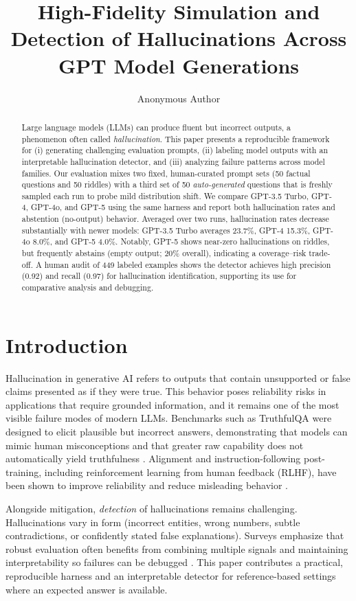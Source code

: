 \documentclass[11pt]{article}
\title{High-Fidelity Simulation and Detection of Hallucinations Across GPT Model Generations}
\author{Anonymous Author}
\date{}
\begin{document}
\maketitle

\begin{abstract}
Large language models (LLMs) can produce fluent but incorrect outputs, a phenomenon often called \emph{hallucination}. This paper presents a reproducible framework for (i) generating challenging evaluation prompts, (ii) labeling model outputs with an interpretable hallucination detector, and (iii) analyzing failure patterns across model families. Our evaluation mixes two fixed, human-curated prompt sets (50 factual questions and 50 riddles) with a third set of 50 \emph{auto-generated} questions that is freshly sampled each run to probe mild distribution shift. We compare GPT-3.5 Turbo, GPT-4, GPT-4o, and GPT-5 using the same harness and report both hallucination rates and abstention (no-output) behavior. Averaged over two runs, hallucination rates decrease substantially with newer models: GPT-3.5 Turbo averages 23.7\%, GPT-4 15.3\%, GPT-4o 8.0\%, and GPT-5 4.0\%. Notably, GPT-5 shows near-zero hallucinations on riddles, but frequently abstains (empty output; 20\% overall), indicating a coverage--risk trade-off. A human audit of 449 labeled examples shows the detector achieves high precision (0.92) and recall (0.97) for hallucination identification, supporting its use for comparative analysis and debugging.
\end{abstract}

\section{Introduction}
Hallucination in generative AI refers to outputs that contain unsupported or false claims presented as if they were true. This behavior poses reliability risks in applications that require grounded information, and it remains one of the most visible failure modes of modern LLMs. Benchmarks such as TruthfulQA were designed to elicit plausible but incorrect answers, demonstrating that models can mimic human misconceptions and that greater raw capability does not automatically yield truthfulness \cite{truthfulqa}. Alignment and instruction-following post-training, including reinforcement learning from human feedback (RLHF), have been shown to improve reliability and reduce misleading behavior \cite{instructgpt,gpt4report}. 

Alongside mitigation, \emph{detection} of hallucinations remains challenging. Hallucinations vary in form (incorrect entities, wrong numbers, subtle contradictions, or confidently stated false explanations). Surveys emphasize that robust evaluation often benefits from combining multiple signals and maintaining interpretability so failures can be debugged \cite{ji_survey}. This paper contributes a practical, reproducible harness and an interpretable detector for reference-based settings where an expected answer is available.
\end{document}
